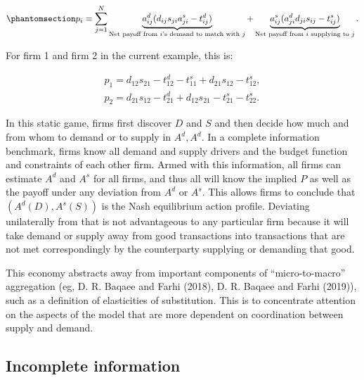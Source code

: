 \documentclass[
]{article}
\theoremstyle{plain}
\theoremstyle{definition}
\theoremstyle{remark}
\begin{document}
\begin{equation}\phantomsection\label{eq-firmlevelpayoff}{
p_i = \sum_{j=1}^N \underbrace{a_{ij}^d (d_{ij} s_{ji} a_{ji}^s - t_{ij}^d)}_{\text{Net payoff from $i$'s demand to match with $j$}} + \underbrace{a_{ij}^s (a_{ji}^d d_{ji} s_{ij} - t_{ij}^s)}_{\text{Net payoff from $i$ supplying to $j$}}.
}\end{equation}

For firm 1 and firm 2 in the current example, this is:

\[
\begin{split}
p_1 = d_{12} s_{21} - t_{12}^d - t_{11}^s + d_{21} s_{12} - t_{12}^s, \\
p_2 = d_{21} s_{12} -t_{21}^d + d_{12} s_{21} - t_{21}^s - t_{22}^s.
\end{split}
\]

In this static game, firms first discover \(D\) and \(S\) and then
decide how much and from whom to demand or to supply in \(A^d, A^d\). In
a complete information benchmark, firms know all demand and supply
drivers and the budget function and constraints of each other firm.
Armed with this information, all firms can estimate \(A^d\) and \(A^s\)
for all firms, and thus all will know the implied \(P\) as well as the
payoff under any deviation from \(A^d\) or \(A^s\). This allows firms to
conclude that \((A^d(D), A^s(S))\) is the Nash equilibrium action
profile. Deviating unilaterally from that is not advantageous to any
particular firm because it will take demand or supply away from good
transactions into transactions that are not met correspondingly by the
counterparty supplying or demanding that good.

This economy abstracts away from important components of
``micro-to-macro'' aggregation (eg, D. R. Baqaee and Farhi (2018), D. R.
Baqaee and Farhi (2019)), such as a definition of elasticities of
substitution. This is to concentrate attention on the aspects of the
model that are more dependent on coordination between supply and demand.

\subsection{Incomplete information}\label{incomplete-information}
\end{document}
